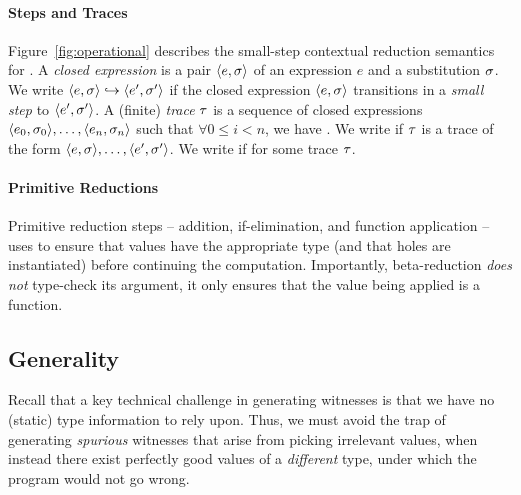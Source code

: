 \paragraph{Steps and Traces}
%
Figure~\ref{fig:operational} describes the small-step contextual
reduction semantics for \lang.
%
A \emph{closed expression} is a pair $\langle e, \sigma \rangle$ of an expression $e$
and a substitution $\sigma$.
%
We write $\langle e, \sigma \rangle \hookrightarrow \langle e', \sigma' \rangle$ if the closed expression $\langle e, \sigma \rangle$
transitions in a \emph{small step} to $\langle e', \sigma' \rangle$.
%
A (finite) \emph{trace} $\tau$ is a sequence of closed expressions
$\langle e_0, \sigma_0 \rangle, \ldots, \langle e_n, \sigma_n \rangle$ such that
$\forall 0 \leq i < n$, we have .
%
We write  if $\tau$ is a trace of the form
$\langle e, \sigma \rangle,\ldots,\langle e', \sigma' \rangle$.
%
We write  if 
for some trace $\tau$.

\paragraph{Primitive Reductions}
Primitive reduction steps -- addition, if-elimination, and
function application -- uses \forcesym to ensure that values have the
appropriate type (and that holes are instantiated) before continuing the
computation. Importantly, beta-reduction \emph{does not} type-check its
argument, it only ensures that the value being applied is a function.


%
\subsection{Generality}\label{sec:soundness}

Recall that a key technical challenge in generating witnesses is
that we have no (static) type information to rely upon. Thus, we
must avoid the trap of generating \emph{spurious} witnesses that
arise from picking irrelevant values, when instead there exist
perfectly good values of a \emph{different} type, under which
the program would not go wrong.

